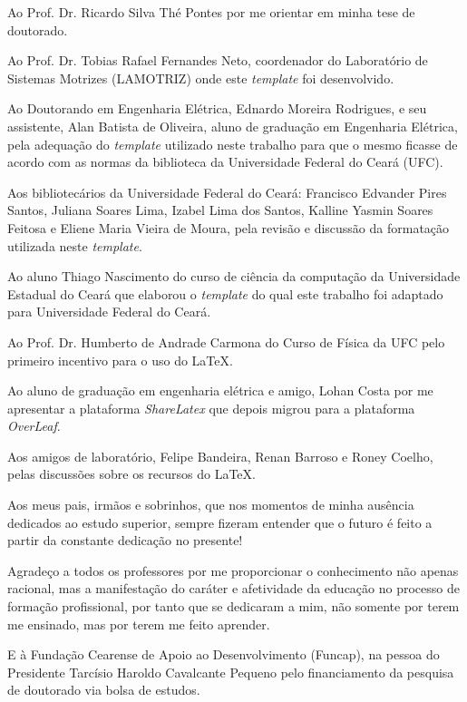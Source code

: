 
Ao Prof. Dr. Ricardo Silva Thé Pontes por me orientar em minha tese de doutorado.

Ao Prof. Dr. Tobias Rafael Fernandes Neto, coordenador do Laboratório de Sistemas Motrizes (LAMOTRIZ) onde este \textit{template} foi desenvolvido. 

Ao Doutorando em Engenharia Elétrica, Ednardo Moreira Rodrigues, e seu assistente, Alan Batista de Oliveira, aluno de graduação em Engenharia Elétrica, pela adequação do \textit{template} utilizado neste trabalho para que o mesmo ficasse de acordo com as normas da biblioteca da Universidade Federal do Ceará (UFC). %

Aos bibliotecários da Universidade Federal do Ceará: Francisco Edvander Pires Santos, Juliana Soares Lima, Izabel Lima dos Santos, Kalline Yasmin Soares Feitosa e Eliene Maria Vieira de Moura, pela revisão e discussão da formatação utilizada neste \textit{template}. 

Ao aluno Thiago Nascimento do curso de ciência da computação da Universidade Estadual do Ceará que elaborou o \textit{template} do qual este trabalho foi adaptado para Universidade Federal do Ceará.

Ao Prof. Dr. Humberto de Andrade Carmona do Curso de Física da UFC pelo primeiro incentivo para o uso do \LaTeX.

Ao aluno de graduação em engenharia elétrica e amigo, Lohan Costa por me apresentar a plataforma \textit{ShareLatex} que depois migrou para a plataforma \textit{OverLeaf}. 

Aos amigos de laboratório, Felipe Bandeira, Renan Barroso e Roney Coelho, pelas discussões sobre os recursos do \LaTeX.

Aos meus pais, irmãos e sobrinhos, que nos momentos de minha ausência dedicados ao estudo superior, sempre fizeram entender que o futuro é feito a partir da constante dedicação no presente!

Agradeço a todos os professores por me proporcionar o conhecimento não apenas racional, mas a manifestação do caráter e afetividade da educação no processo de formação profissional, por tanto que se dedicaram a mim, não somente por terem me ensinado, mas por terem me feito aprender. 

E à Fundação Cearense de Apoio ao Desenvolvimento (Funcap), na pessoa do Presidente Tarcísio Haroldo Cavalcante Pequeno pelo financiamento da pesquisa de doutorado via bolsa de estudos.